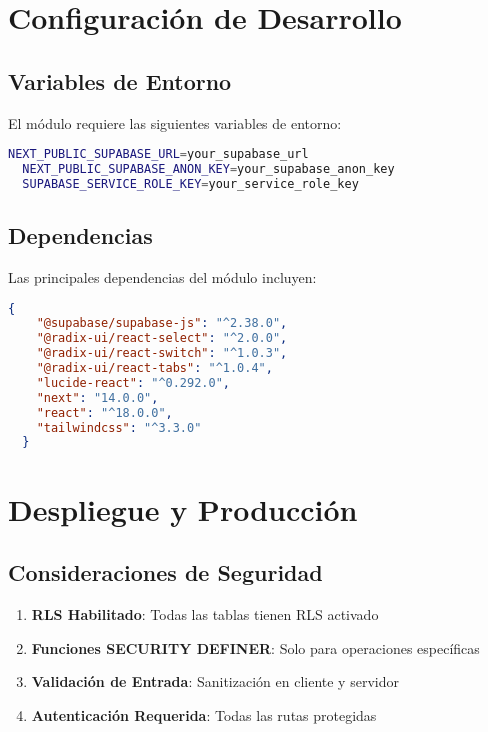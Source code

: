 \documentclass[12pt,a4paper]{article}
\begin{document}
\section{Configuración de Desarrollo}

\subsection{Variables de Entorno}

El módulo requiere las siguientes variables de entorno:

\begin{lstlisting}[language=bash, caption=Variables de entorno necesarias]
  NEXT_PUBLIC_SUPABASE_URL=your_supabase_url
  NEXT_PUBLIC_SUPABASE_ANON_KEY=your_supabase_anon_key
  SUPABASE_SERVICE_ROLE_KEY=your_service_role_key
\end{lstlisting}

\subsection{Dependencias}

Las principales dependencias del módulo incluyen:

\begin{lstlisting}[language=json, caption=Dependencias principales]
  {
    "@supabase/supabase-js": "^2.38.0",
    "@radix-ui/react-select": "^2.0.0",
    "@radix-ui/react-switch": "^1.0.3",
    "@radix-ui/react-tabs": "^1.0.4",
    "lucide-react": "^0.292.0",
    "next": "14.0.0",
    "react": "^18.0.0",
    "tailwindcss": "^3.3.0"
  }
\end{lstlisting}

\section{Despliegue y Producción}

\subsection{Consideraciones de Seguridad}

\begin{enumerate}
  \item \textbf{RLS Habilitado}: Todas las tablas tienen RLS activado
  \item \textbf{Funciones SECURITY DEFINER}: Solo para operaciones específicas
  \item \textbf{Validación de Entrada}: Sanitización en cliente y servidor
  \item \textbf{Autenticación Requerida}: Todas las rutas protegidas
\end{enumerate}
\end{document}
